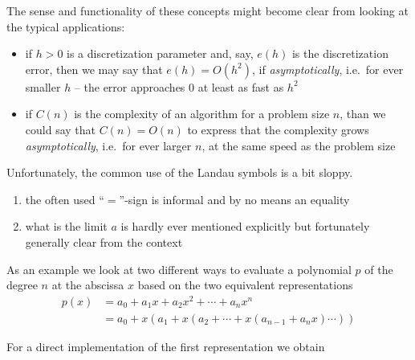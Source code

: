 \documentclass[
]{book}
\providecommand{\tightlist}{%
  \setlength{\itemsep}{0pt}\setlength{\parskip}{0pt}}
\theoremstyle{definition}
\theoremstyle{definition}
\theoremstyle{definition}
\theoremstyle{definition}
\theoremstyle{remark}
\begin{document}
The sense and functionality of these concepts might become clear from looking at the typical applications:

\begin{itemize}
\tightlist
\item
  if \(h> 0\) is a discretization parameter and, say, \(e(h)\) is the discretization error, then we may say that \(e(h) = O(h^2)\), if \emph{asymptotically}, i.e.~for ever smaller \(h\) -- the error approaches \(0\) at least as fast as \(h^2\)
\item
  if \(C(n)\) is the complexity of an algorithm for a problem size \(n\), than we could say that \(C(n) = O(n)\) to express that the complexity grows \emph{asymptotically}, i.e.~for ever larger \(n\), at the same speed as the problem size
\end{itemize}

Unfortunately, the common use of the Landau symbols is a bit sloppy.

\begin{enumerate}
\def\labelenumi{\arabic{enumi}.}
\tightlist
\item
  the often used ``\(=\)''-sign is informal and by no means an equality
\item
  what is the limit \(a\) is hardly ever mentioned explicitly but fortunately generally clear from the context
\end{enumerate}

As an example we look at two different ways to evaluate a polynomial \(p\) of the degree \(n\) at the abscissa \(x\) based on the two equivalent representations
\begin{equation*}
\begin{split}
p(x) &= a_0 + a_1x +  a_2x^2+ \dotsm + a_nx^n \\
     &= a_0 + x(a_1 + x(a_2 + \dotsm +x(a_{n-1} + a_nx) \dotsm ))
\end{split}
\end{equation*}

For a direct implementation of the first representation we obtain
\end{document}
